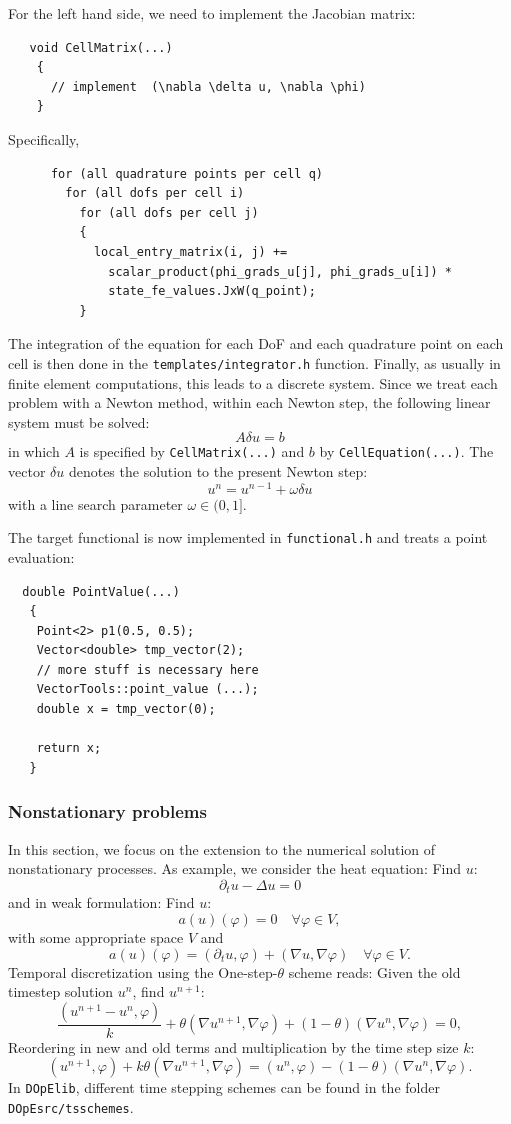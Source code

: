 \documentclass[prodmode,acmtoms]{acmsmall}
\numberwithin{equation}{section}
\renewcommand{\phi}{\varphi}
\newcommand{\dope}{\texttt{DOpElib}}
\begin{document}
For the left hand side, we need to implement the Jacobian matrix:
\begin{lstlisting}
   void CellMatrix(...)
    {
      // implement  (\nabla \delta u, \nabla \phi)
    }
\end{lstlisting}
Specifically,
\begin{lstlisting}
      for (all quadrature points per cell q)      
        for (all dofs per cell i)    
          for (all dofs per cell j)
          {
            local_entry_matrix(i, j) += 
              scalar_product(phi_grads_u[j], phi_grads_u[i]) * 
              state_fe_values.JxW(q_point);
          }
\end{lstlisting}
The integration of the equation for each DoF and each quadrature point on each
cell is then done 
in the \texttt{templates/integrator.h} function. Finally, as usually in 
finite element computations, this leads to a discrete system. Since
we treat each problem with a Newton method, within each Newton step, the 
following linear system must be solved:
\[
A\delta u = b
\]
in which $A$ is specified by \texttt{CellMatrix(...)} and 
$b$ by \texttt{CellEquation(...)}. The vector $\delta u$ denotes the solution to the 
present Newton step:
\[
u^n = u^{n-1} + \omega \delta u
\]
with a line search parameter $\omega\in (0,1]$.


The target functional 
is now implemented in \texttt{functional.h} and 
treats a point evaluation:
\begin{lstlisting}
  double PointValue(...)
   {
    Point<2> p1(0.5, 0.5);
    Vector<double> tmp_vector(2);
    // more stuff is necessary here
    VectorTools::point_value (...);
    double x = tmp_vector(0);

    return x;
   }
\end{lstlisting}




\subsubsection{Nonstationary problems}
In this section, we focus on the extension to 
the numerical solution of nonstationary processes. 
As example, we consider the heat equation:
Find $u$:
\[
\partial_t u - \Delta u = 0
\]
and in weak formulation:
Find $u$:
\[
a(u)(\phi) = 0 \quad \forall \phi \in V,
\]
with some appropriate space $V$ and 
\[
a(u)(\phi) = (\partial_t u, \phi) + (\nabla u, \nabla \phi) \quad \forall \phi \in V.
\]
Temporal discretization using the One-step-$\theta$ scheme reads:
Given the old timestep solution $u^n$, find $u^{n+1}$:
\[
\frac{(u^{n+1} - u^{n}, \phi)}{k} + \theta (\nabla u^{n+1}, \nabla \phi)
+ (1 - \theta) (\nabla u^{n}, \nabla \phi) = 0,
\]
Reordering in new and old terms and multiplication by the time step size $k$:
\[
(u^{n+1},\phi) + k \theta (\nabla u^{n+1}, \nabla \phi)
= (u^n, \phi) - (1 - \theta) (\nabla u^{n}, \nabla \phi).
\]
In \dope, different time stepping schemes can be found 
in the folder \texttt{DOpEsrc/tsschemes}.
\end{document}
